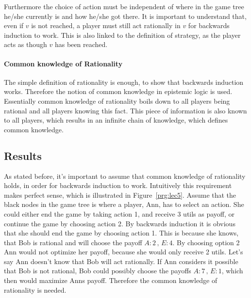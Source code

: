 Furthermore the choice of action must be independent of where in the game tree he/she currently is and how he/she got there.
It is important to understand that, even if $v$ is not reached, a player must still act rationally in $v$ for backwards induction to work. This is also linked to the definition of strategy, as the player acts as though $v$ has been reached.

\paragraph*{Common knowledge of Rationality} The simple definition of rationality is enough, to show that backwards induction works. Therefore the notion of common knowledge in epistemic logic is used. 
Essentially common knowledge of rationality boils down to all players being rational and all players knowing this fact. This piece of information is also known to all players, which results in an infinite chain of knowledge, which defines common knowledge. 

\subsection{Results}
As stated before, it's important to assume that common knowledge of rationality holds, in order for backwards induction to work.
Intuitively this requirement makes perfect sense, which is illustrated in Figure~\ref{prg:lec5}.
Assume that the black nodes in the game tree is where a player, Ann, has to select an action. She could either end the game by taking action 1, and receive 3 utils as payoff, or continue the game by choosing action 2. By backwards induction it is obvious that she should end the game by choosing action 1. This is because she knows, that Bob is rational and will choose the payoff $A:2 \, ,\, E:4$. By choosing option 2 Ann would not optimize her payoff, because she would only receive 2 utils. Let's say Ann doesn't know that Bob will act rationally. If Ann considers it possible that Bob is not rational, Bob could possibly choose the payoffs $A:7 \, ,\, E:1$, which then would maximize Anns payoff. Therefore the common knowledge of rationality is needed.


